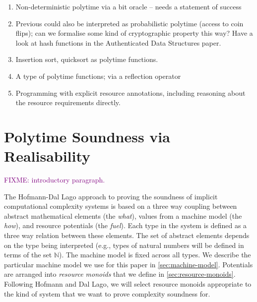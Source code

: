 \documentclass[acmsmall,review]{acmart}
\newcommand{\bob}[1]{\textcolor{purple}{FIXME: #1}}
\begin{document}
\begin{enumerate}
\item Non-deterministic polytime via a bit oracle -- needs a statement
  of success
\item Previous could also be interpreted as probabilistic polytime
  (access to coin flips); can we formalise some kind of cryptographic
  property this way? Have a look at hash functions in the
  Authenticated Data Structures paper.
\item Insertion sort, quicksort as polytime functions.
\item A type of polytime functions; via a reflection operator
\item Programming with explicit resource annotations, including
  reasoning about the resource requirements directly.
\end{enumerate}

\section{Polytime Soundness via Realisability}
\label{sec:soundness}

\newcommand{\cstaccess}{c_{\mathit{access}}}
\newcommand{\cstmkclo}{c_{\mathit{mkclo}}}
\newcommand{\cstapp}{c_{\mathit{app}}}
\newcommand{\cstmkpair}{c_{\mathit{mkpair}}}
\newcommand{\cstmkunit}{c_{\mathit{mkunit}}}
\newcommand{\cstTrue}{c_{\mathit{mktrue}}}
\newcommand{\cstFalse}{c_{\mathit{mkfalse}}}
\newcommand{\cstLetpair}{c_{\mathit{letpair}}}
\newcommand{\cstSeq}{c_{\mathit{seq}}}
\newcommand{\cstIf}{c_{\mathit{if}}}

\newcommand{\clo}[2]{\mathsf{clo}\langle #1 , #2 \rangle}
\newcommand{\synTrue}{\mathsf{true}}
\newcommand{\synFalse}{\mathsf{false}}

\newcommand{\ExpSet}{\mathcal{E}}
\newcommand{\ValSet}{\mathcal{V}}

\newcommand{\rplus}{\oplus}
\newcommand{\rzero}{\emptyset}

\bob{introductory paragraph.}

The Hofmann-Dal Lago approach to proving the soundness of implicit
computational complexity systems is based on a three way coupling
between abstract mathematical elements (the \emph{what}), values from
a machine model (the \emph{how}), and resource potentials (the
\emph{fuel}). Each type in the system is defined as a three way
relation between these elements. The set of abstract elements depends
on the type being interpreted (e.g., types of natural numbers will be
defined in terms of the set $\mathbb{N}$). The machine model is fixed
across all types. We describe the particular machine model we use for
this paper in \autoref{sec:machine-model}. Potentials are arranged
into \emph{resource monoids} that we define in
\autoref{sec:resource-monoids}. Following Hofmann and Dal Lago, we
will select resource monoids appropriate to the kind of system that we
want to prove complexity soundness for.
\end{document}
